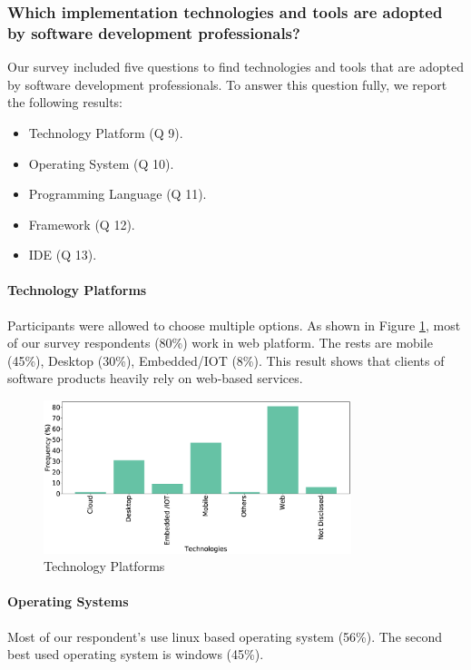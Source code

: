 \subsubsection{Which implementation technologies and tools are adopted by software development professionals?}
\label{tools}

Our survey included five questions to find technologies and tools that are adopted by software development professionals. To answer this question fully, we report the following results:
\begin{itemize}
\item Technology Platform (Q 9).
\item Operating System (Q 10).
\item Programming Language (Q 11).
\item Framework (Q 12).
\item IDE (Q 13).
\end{itemize}


\paragraph{Technology Platforms}
Participants were allowed to choose multiple options. As shown in Figure \ref{fig:platforms}, most of our survey respondents (80\%) work in web platform. The rests are mobile (45\%), Desktop (30\%), Embedded/IOT (8\%). This result shows that clients of software products heavily rely on web-based services. 

\begin{figure}[htbp]
\centering
  \includegraphics[width=0.8\textwidth]{Figures/Respondents_Technologies}
  \caption{Technology Platforms}
  \label{fig:platforms}
\end{figure}



\paragraph{Operating Systems}
Most of our respondent's use linux based operating system (56\%). The second best used operating system is windows (45\%).

